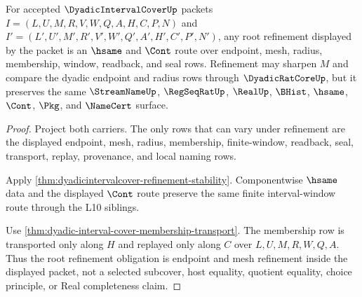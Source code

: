\begin{theorem}
\label{thm:dyadicintervalcover-root-refinement-obligations}
For accepted $\DyadicIntervalCoverUp$ packets $I=(L,U,M,R,V,W,Q,A,H,C,P,N)$ and $I'=(L',U',M',R',V',W',Q',A',H',C',P',N')$, any root refinement displayed by the packet is an $\hsame$ and $\Cont$ route over endpoint, mesh, radius, membership, window, readback, and seal rows. Refinement may sharpen $M$ and compare the dyadic endpoint and radius rows through $\DyadicRatCoreUp$, but it preserves the same $\StreamNameUp$, $\RegSeqRatUp$, $\RealUp$, $\BHist$, $\hsame$, $\Cont$, $\Pkg$, and $\NameCert$ surface.
\end{theorem}
\begin{proof}
Project both carriers. The only rows that can vary under refinement are the displayed endpoint, mesh, radius, membership, finite-window, readback, seal, transport, replay, provenance, and local naming rows.

Apply \autoref{thm:dyadicintervalcover-refinement-stability}. Componentwise $\hsame$ data and the displayed $\Cont$ route preserve the same finite interval-window route through the L10 siblings.

Use \autoref{thm:dyadic-interval-cover-membership-transport}. The membership row is transported only along $H$ and replayed only along $C$ over $L,U,M,R,W,Q,A$. Thus the root refinement obligation is endpoint and mesh refinement inside the displayed packet, not a selected subcover, host equality, quotient equality, choice principle, or Real completeness claim.
\end{proof}

